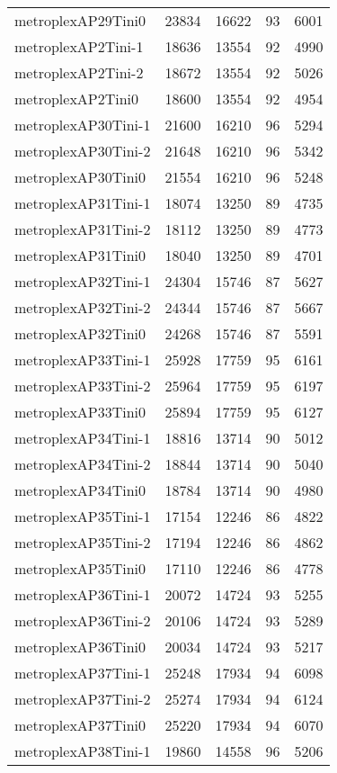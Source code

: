 \begin{tabular}{lrrrr}
metroplexAP29Tini0 & 23834 & 16622 & 93 & 6001 \\
metroplexAP2Tini-1 & 18636 & 13554 & 92 & 4990 \\
metroplexAP2Tini-2 & 18672 & 13554 & 92 & 5026 \\
metroplexAP2Tini0 & 18600 & 13554 & 92 & 4954 \\
metroplexAP30Tini-1 & 21600 & 16210 & 96 & 5294 \\
metroplexAP30Tini-2 & 21648 & 16210 & 96 & 5342 \\
metroplexAP30Tini0 & 21554 & 16210 & 96 & 5248 \\
metroplexAP31Tini-1 & 18074 & 13250 & 89 & 4735 \\
metroplexAP31Tini-2 & 18112 & 13250 & 89 & 4773 \\
metroplexAP31Tini0 & 18040 & 13250 & 89 & 4701 \\
metroplexAP32Tini-1 & 24304 & 15746 & 87 & 5627 \\
metroplexAP32Tini-2 & 24344 & 15746 & 87 & 5667 \\
metroplexAP32Tini0 & 24268 & 15746 & 87 & 5591 \\
metroplexAP33Tini-1 & 25928 & 17759 & 95 & 6161 \\
metroplexAP33Tini-2 & 25964 & 17759 & 95 & 6197 \\
metroplexAP33Tini0 & 25894 & 17759 & 95 & 6127 \\
metroplexAP34Tini-1 & 18816 & 13714 & 90 & 5012 \\
metroplexAP34Tini-2 & 18844 & 13714 & 90 & 5040 \\
metroplexAP34Tini0 & 18784 & 13714 & 90 & 4980 \\
metroplexAP35Tini-1 & 17154 & 12246 & 86 & 4822 \\
metroplexAP35Tini-2 & 17194 & 12246 & 86 & 4862 \\
metroplexAP35Tini0 & 17110 & 12246 & 86 & 4778 \\
metroplexAP36Tini-1 & 20072 & 14724 & 93 & 5255 \\
metroplexAP36Tini-2 & 20106 & 14724 & 93 & 5289 \\
metroplexAP36Tini0 & 20034 & 14724 & 93 & 5217 \\
metroplexAP37Tini-1 & 25248 & 17934 & 94 & 6098 \\
metroplexAP37Tini-2 & 25274 & 17934 & 94 & 6124 \\
metroplexAP37Tini0 & 25220 & 17934 & 94 & 6070 \\
metroplexAP38Tini-1 & 19860 & 14558 & 96 & 5206 \\

\end{tabular}
